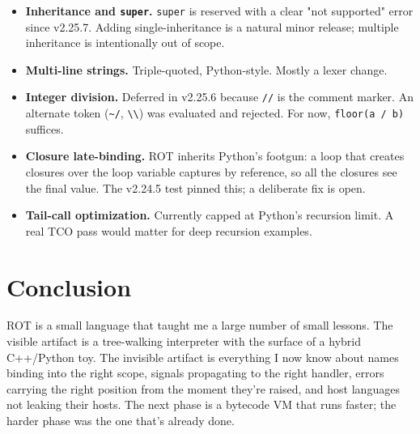 \documentclass[11pt]{article}
\begin{document}
\begin{itemize}[leftmargin=*,nosep,topsep=4pt,partopsep=0pt]
  \item \textbf{Inheritance and \texttt{super}.} \texttt{super} is reserved with a clear "not supported" error since v2.25.7. Adding single-inheritance is a natural minor release; multiple inheritance is intentionally out of scope.
  \item \textbf{Multi-line strings.} Triple-quoted, Python-style. Mostly a lexer change.
  \item \textbf{Integer division.} Deferred in v2.25.6 because \texttt{//} is the comment marker. An alternate token (\texttt{\textasciitilde/}, \texttt{\textbackslash\textbackslash}) was evaluated and rejected. For now, \texttt{floor(a / b)} suffices.
  \item \textbf{Closure late-binding.} ROT inherits Python's footgun: a loop that creates closures over the loop variable captures by reference, so all the closures see the final value. The v2.24.5 test pinned this; a deliberate fix is open.
  \item \textbf{Tail-call optimization.} Currently capped at Python's recursion limit. A real TCO pass would matter for deep recursion examples.
\end{itemize}

\section{Conclusion}

ROT is a small language that taught me a large number of small lessons. The visible artifact is a tree-walking interpreter with the surface of a hybrid C++/Python toy. The invisible artifact is everything I now know about names binding into the right scope, signals propagating to the right handler, errors carrying the right position from the moment they're raised, and host languages not leaking their hosts. The next phase is a bytecode VM that runs faster; the harder phase was the one that's already done.



\end{document}
